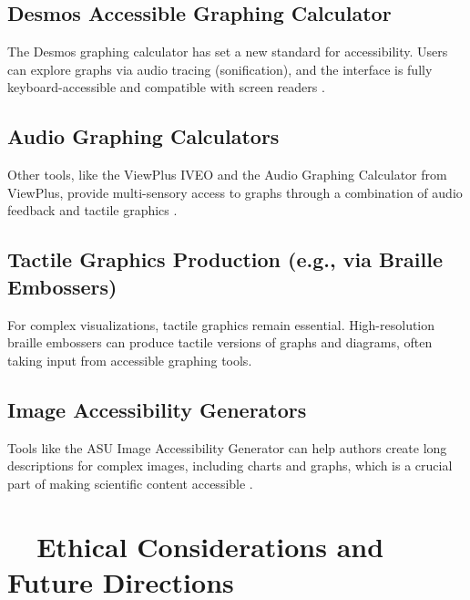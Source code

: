 \subsection{Desmos Accessible Graphing Calculator}\label{ch11:ssec:desmos}
The Desmos graphing calculator has set a new standard for accessibility. Users can explore graphs via audio tracing (sonification), and the interface is fully keyboard-accessible and compatible with screen readers \supercite{Desmos, DesmosAccessibility}.

\subsection{Audio Graphing Calculators}\label{ch11:ssec:audio-graphing}
Other tools, like the ViewPlus IVEO and the Audio Graphing Calculator from ViewPlus, provide multi-sensory access to graphs through a combination of audio feedback and tactile graphics \supercite{ViewPlusAGC, OrionTI84}.

\subsection{Tactile Graphics Production (e.g., via Braille Embossers)}\label{ch11:ssec:tactile-graphics}
For complex visualizations, tactile graphics remain essential. High-resolution braille embossers can produce tactile versions of graphs and diagrams, often taking input from accessible graphing tools.

\subsection{Image Accessibility Generators}\label{ch11:ssec:image-generators}
Tools like the ASU Image Accessibility Generator can help authors create long descriptions for complex images, including charts and graphs, which is a crucial part of making scientific content accessible \supercite{ASUImageAccessibilityGenerator}.

\section{~~Ethical Considerations and Future Directions}\label{ch11:sec:ethics}
